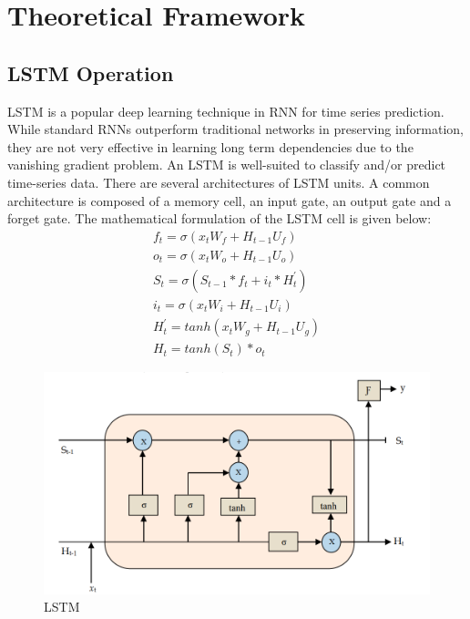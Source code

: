 \chapter{Theoretical Framework}
\vspace{-18pt}
\section{LSTM Operation}
\vspace{-18pt}
LSTM is a popular deep learning technique in RNN for time series prediction. While standard RNNs outperform traditional networks in preserving information, they are not very effective in learning long term dependencies due to the vanishing gradient problem. An LSTM is well-suited to classify and/or predict time-series data. There are several architectures of LSTM units. A common architecture is composed of a memory cell, an input gate, an output gate and a forget gate. The mathematical formulation of the LSTM cell is given below:
\begin{eqnarray}
	f_t = \sigma(x_tW_f + H_{t-1}U_f)\\
	o_t = \sigma(x_tW_o + H_{t-1}U_o)\\
	S_t = \sigma(S_{t-1} *f_t + i_t * H^{'}_t)\\
	i_t = \sigma(x_tW_i + H_{t-1}U_i)\\
	H^{'}_t = tanh(x_tW_g + H_{t-1}U_g)\\
	H_t = tanh(S_t)*o_t
\end{eqnarray}
\begin{figure}[tbh] %
	\begin{center}
		\includegraphics[width=5in]{images/l1.png} 
		\caption{LSTM} %
		\label{LSTM} %
	\end{center}
\end{figure}
\newpage
